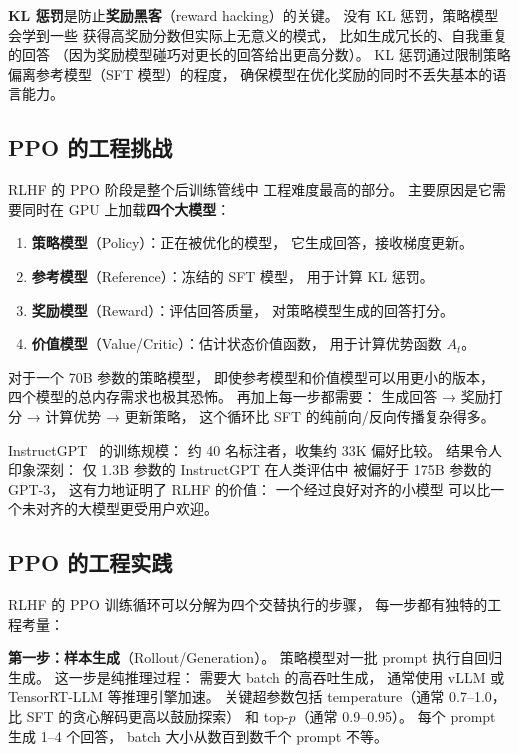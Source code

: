\textbf{KL 惩罚}是防止\textbf{奖励黑客}（reward hacking）的关键。
没有 KL 惩罚，策略模型会学到一些
获得高奖励分数但实际上无意义的模式，
比如生成冗长的、自我重复的回答
（因为奖励模型碰巧对更长的回答给出更高分数）。
KL 惩罚通过限制策略偏离参考模型（SFT 模型）的程度，
确保模型在优化奖励的同时不丢失基本的语言能力。

\subsection{PPO 的工程挑战}

RLHF 的 PPO 阶段是整个后训练管线中
工程难度最高的部分。
主要原因是它需要同时在 GPU 上加载\textbf{四个大模型}：
\begin{enumerate}[noitemsep]
  \item \textbf{策略模型}（Policy）：正在被优化的模型，
        它生成回答，接收梯度更新。
  \item \textbf{参考模型}（Reference）：冻结的 SFT 模型，
        用于计算 KL 惩罚。
  \item \textbf{奖励模型}（Reward）：评估回答质量，
        对策略模型生成的回答打分。
  \item \textbf{价值模型}（Value/Critic）：估计状态价值函数，
        用于计算优势函数 $A_t$。
\end{enumerate}

对于一个 70B 参数的策略模型，
即使参考模型和价值模型可以用更小的版本，
四个模型的总内存需求也极其恐怖。
再加上每一步都需要：
生成回答 → 奖励打分 → 计算优势 → 更新策略，
这个循环比 SFT 的纯前向/反向传播复杂得多。

InstructGPT~\cite{ouyang2022rlhf} 的训练规模：
约 40 名标注者，收集约 33K 偏好比较。
结果令人印象深刻：
仅 1.3B 参数的 InstructGPT 在人类评估中
被偏好于 175B 参数的 GPT-3，
这有力地证明了 RLHF 的价值：
一个经过良好对齐的小模型
可以比一个未对齐的大模型更受用户欢迎。

\subsection{PPO 的工程实践}

RLHF 的 PPO 训练循环可以分解为四个交替执行的步骤，
每一步都有独特的工程考量：

\textbf{第一步：样本生成}（Rollout/Generation）。
策略模型对一批 prompt 执行自回归生成。
这一步是纯推理过程：
需要大 batch 的高吞吐生成，
通常使用 vLLM 或 TensorRT-LLM 等推理引擎加速。
关键超参数包括 temperature（通常 0.7--1.0，
比 SFT 的贪心解码更高以鼓励探索）
和 top-$p$（通常 0.9--0.95）。
每个 prompt 生成 1--4 个回答，
batch 大小从数百到数千个 prompt 不等。

